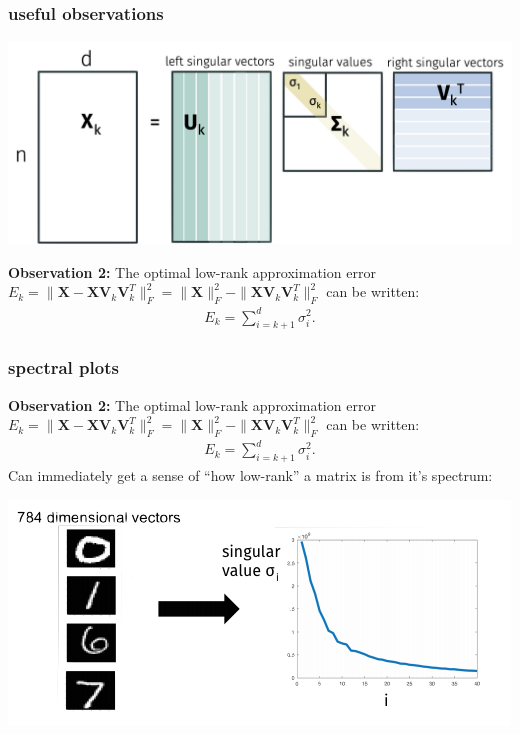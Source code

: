 \documentclass[compress]{beamer}
\newcommand{\bv}[1]{\mathbf{#1}}
\begin{document}
\begin{frame}[t]
	\frametitle{useful observations}
	\begin{center}
		\includegraphics[width=.6\textwidth]{svdk.png}
	\end{center} 
	\textbf{Observation 2:}
	The optimal low-rank approximation error $E_k = \|\bv{X} - \bv{X}\bv{V}_k\bv{V}_k^T\|_F^2 = \|\bv{X}\|_F^2 - \|\bv{X}\bv{V}_k\bv{V}_k^T\|_F^2$ can be written:
	\begin{align*}
		E_k = \sum_{i=k+1}^d \sigma_i^2.
	\end{align*}
\end{frame}

\begin{frame}[t]
	\frametitle{spectral plots}
	\textbf{Observation 2:}
	The optimal low-rank approximation error $E_k = \|\bv{X} - \bv{X}\bv{V}_k\bv{V}_k^T\|_F^2 = \|\bv{X}\|_F^2 - \|\bv{X}\bv{V}_k\bv{V}_k^T\|_F^2$ can be written:
	\begin{align*}
	E_k = \sum_{i=k+1}^d \sigma_i^2.
	\end{align*}
	Can immediately get a sense of ``how low-rank'' a matrix is from it's spectrum:
	\begin{center}
		\includegraphics[width=.8\textwidth]{mnist_spectrum.png}
	\end{center}
\end{frame}
\end{document}
